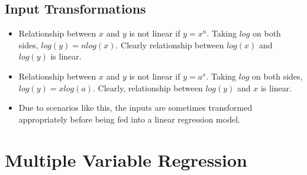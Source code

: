 \documentclass[11pt, a4paper]{article}
\begin{document}
\subsection{Input Transformations}

\begin{itemize}
	\item Relationship between $x$ and $y$ is not linear if $y = x^n$. Taking $log$ on both sides, $log(y) = nlog(x)$. Clearly relationship between $log(x)$ and $log(y)$ is linear. 
	\item Relationship between $x$ and $y$ is not linear if $y = a^x$. Taking $log$ on both sides, $log(y) = xlog(a)$. Clearly, relationship between $log(y)$ and $x$ is linear.
	\item Due to scenarios like this, the inputs are sometimes transformed appropriately before being fed into a linear regression model.
\end{itemize}
 
\section{Multiple Variable Regression} 
\end{document}
